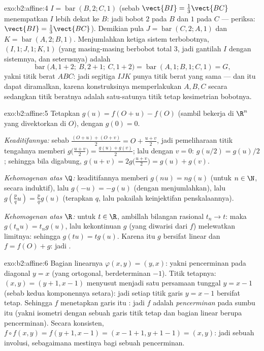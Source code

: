 \begin{solution}{exo:b2:affine:4}
$I = \operatorname{bar}(B, 2; C, 1)$ (sebab $\vect{BI} =
\frac13\vect{BC}$ menempatkan $I$ lebih dekat ke $B$: jadi bobot $2$ pada $B$
dan $1$ pada $C$ --- periksa: $\vect{BI} = \frac{1}{3}\vect{BC}$).
Demikian pula $J = \operatorname{bar}(C, 2; A, 1)$ dan $K =
\operatorname{bar}(A, 2; B, 1)$. Menjumlahkan ketiga sistem terbobotnya,
 $(I, 1; J, 1; K, 1)$ (yang masing-masing berbobot total
$3$, jadi gantilah $I$ dengan sistemnya, dan seterusnya) adalah
\[
\operatorname{bar}\bigl(A, 1 + 2;\ B, 2 + 1;\ C, 1 + 2\bigr)
= \operatorname{bar}(A, 1; B, 1; C, 1) = G ,
\]
yakni titik berat $ABC$: jadi segitiga $IJK$ punya titik berat yang sama ---
dan itu dapat diramalkan, karena konstruksinya memperlakukan $A, B, C$ secara 
sedangkan titik beratnya adalah satu-satunya titik tetap kesimetrian 
bobotnya.
\end{solution}

\begin{solution}{exo:b2:affine:5}
Tetapkan $g(u) = f(O + u) - f(O)$ (sambil bekerja di $\R^n$ yang divektorkan di
$O$), dengan $g(0) = 0$.

\emph{Keaditifannya:} sebab $\frac{(O + u) + (O + v)}{2} = O + \frac{u +
v}{2}$, jadi pemeliharaan titik tengahnya memberi $g\bigl(\frac{u+v}{2}\bigr)
= \frac{g(u) + g(v)}{2}$; lalu dengan $v = 0$: $g(u/2) = g(u)/2$;
sehingga bila digabung, $g(u + v) = 2g\bigl(\frac{u+v}{2}\bigr) = g(u) + g(v)$.

\emph{Kehomogenan atas $\Q$:} keaditifannya memberi $g(nu) = ng(u)$ (untuk $n \in
\N$, secara induktif), lalu $g(-u) = -g(u)$ (dengan menjumlahkan), lalu $g(\frac pq u) =
\frac pq g(u)$ (terapkan $q$, lalu pakailah keinjektifan penskalaannya).

\emph{Kehomogenan atas $\R$:} untuk $t \in \R$, ambillah bilangan rasional $t_n \to
t$: maka $g(t_nu) = t_ng(u)$, lalu kekontinuan $g$ (yang diwarisi dari $f$)
melewatkan limitnya: sehingga $g(tu) = tg(u)$. Karena itu $g$ bersifat linear dan $f =
f(O) + g$: jadi .
\end{solution}

\begin{solution}{exo:b2:affine:6}
Bagian linearnya $\varphi(x,y) = (y, x)$: yakni pencerminan pada diagonal
$y = x$ (yang ortogonal, berdeterminan $-1$). Titik tetapnya: $(x, y) = (y
+ 1, x - 1)$ menyusut menjadi satu persamaan tunggal $y = x - 1$ (sebab kedua
komponennya setara): jadi setiap titik garis $y = x - 1$ bersifat
tetap. Sehingga $f$ menetapkan garis itu : jadi $f$
adalah \emph{pencerminan} pada sumbu itu (yakni isometri dengan sebuah garis titik
tetap dan bagian linear berupa pencerminan). Secara konsisten, $f \circ
f(x,y) = f(y+1, x-1) = (x - 1 + 1, y + 1 - 1) = (x, y)$: jadi sebuah
involusi, sebagaimana mestinya bagi sebuah pencerminan.
\end{solution}

